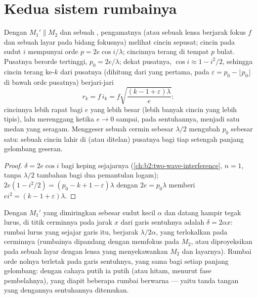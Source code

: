\section{Kedua sistem rumbainya}

\begin{proposition}\label{prop:b2:michelson:rings}
Dengan $M_1' \parallel M_2$ dan sebuah , pengamatnya (atau sebuah lensa
berjarak fokus $f$ dan sebuah layar pada bidang fokusnya) melihat cincin
sepusat; cincin pada sudut $i$ mempunyai orde $p = 2e\cos i/\lambda$; cincinnya
terang di tempat $p$ bulat. Pusatnya berorde tertinggi, $p_0 =
2e/\lambda$; dekat pusatnya, $\cos i \approx 1 - i^2/2$, sehingga cincin terang ke-$k$ dari
pusatnya (dihitung dari yang pertama, pada $\varepsilon = p_0 - \lfloor p_0\rfloor$
di bawah orde pusatnya) berjari-jari
\[
r_k = f\,i_k = f\sqrt{\frac{(k - 1 + \varepsilon)\lambda}e} :
\]
cincinnya lebih rapat bagi $e$ yang lebih besar (lebih banyak cincin yang lebih tipis), lalu merenggang ketika $e \to 0$
sampai, pada sentuhannya, menjadi satu medan yang seragam. Menggeser sebuah cermin sebesar $\lambda/2$ mengubah
$p_0$ sebesar satu: sebuah cincin lahir di (atau ditelan) pusatnya bagi tiap
setengah panjang gelombang geseran.
\end{proposition}

\begin{proof}
$\delta = 2e\cos i$ bagi keping sejajarnya (\cref{ch:b2:two-wave-interference},
$n = 1$, tanpa $\lambda/2$ tambahan bagi dua pemantulan logam); $2e(1 - i^2/2) =
(p_0 - k + 1 - \varepsilon)\lambda$ dengan $2e = p_0\lambda$ memberi $ei^2 = (k - 1 + \varepsilon)\lambda$.
\end{proof}

\begin{proposition}\label{prop:b2:michelson:wedge}
Dengan $M_1'$ yang dimiringkan sebesar sudut kecil $\alpha$ dan datang hampir tegak lurus,
 di titik cerminnya pada jarak $x$ dari
garis sentuhnya adalah $\delta = 2\alpha x$: rumbai lurus yang sejajar garis itu,
berjarak $\lambda/2\alpha$, yang terlokalkan pada cerminnya (rumbainya dipandang dengan memfokus
pada $M_2$, atau diproyeksikan pada sebuah layar dengan lensa yang menyekawankan $M_2$ dan
layarnya). Rumbai orde nolnya terletak pada garis sentuhnya, yang sama bagi
setiap panjang gelombang: dengan cahaya putih ia putih (atau hitam, menurut
fase pembelahnya), yang diapit beberapa rumbai berwarna --- yaitu
tanda tangan yang dengannya sentuhannya ditemukan.
\end{proposition}

